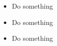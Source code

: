 \documentclass[10pt,a4paper]{Protocol}
\begin{document}
\begin{itemize}
	\item Do something
\end{itemize}
\divider

\begin{itemize}
	\item Do something
\end{itemize}
\divider

\begin{itemize}
	\item Do something
\end{itemize}



\end{document}
